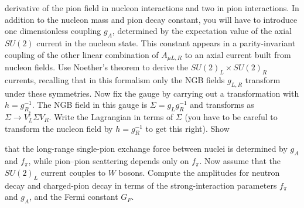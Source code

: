 \begin{banksproblems}
derivative of the pion field in nucleon interactions and two in pion
interactions. In addition to the nucleon mass and pion decay constant, you will
have to introduce one dimensionless coupling $g_A$, determined by the
expectation value of the axial $SU(2)$ current in the nucleon state. This
constant appears in a parity-invariant coupling of the other linear combination
of $A_{\mu L,R}$ to an axial current built from nucleon fields. Use Noether's
theorem to derive the $SU(2)_L\times SU(2)_R$ currents, recalling that in this
formalism only the NGB fields $g_{L,R}$ transform under these symmetries. Now
fix the gauge by carrying out a transformation with $h=g_R^{-1}$. The NGB
field in this gauge is $\Sigma=g_Lg_R^{-1}$ and transforms as
$\Sigma\to V_L^\dagger\Sigma V_R$. Write the Lagrangian in terms of $\Sigma$
(you have to be careful to transform the nucleon field by $h=g_R^{-1}$ to get
this right). Show

that the long-range single-pion exchange force between nuclei is determined by
$g_A$ and $f_\pi$, while pion--pion scattering depends only on $f_\pi$. Now
assume that the $SU(2)_L$ current couples to $W$ bosons. Compute the amplitudes
for neutron decay and charged-pion decay in terms of the strong-interaction
parameters $f_\pi$ and $g_A$, and the Fermi constant $G_F$.


\end{banksproblems}
